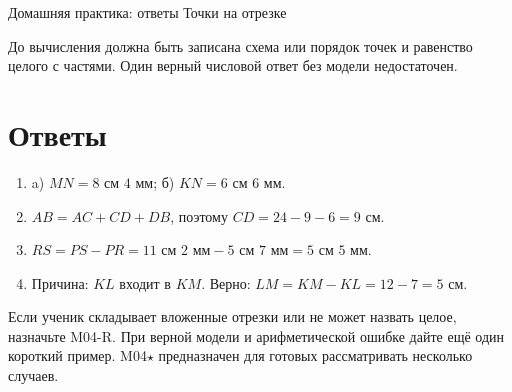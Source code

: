 \worksheettitle
  {Домашняя практика: ответы}
  { Точки на отрезке}

\begin{teacherbox}[Критерии]
  До вычисления должна быть записана схема или порядок точек и равенство
  целого с частями. Один верный числовой ответ без модели недостаточен.
\end{teacherbox}

\section{Ответы}

\begin{enumerate}
  \item a) $MN=8\text{ см }4\text{ мм}$;
    б) $KN=6\text{ см }6\text{ мм}$.
  \item $AB=AC+CD+DB$, поэтому $CD=24-9-6=9$ см.
  \item $RS=PS-PR=11\text{ см }2\text{ мм}-5\text{ см }7\text{ мм}
    =5\text{ см }5\text{ мм}$.
  \item Причина: $KL$ входит в $KM$. Верно:
    $LM=KM-KL=12-7=5$ см.
\end{enumerate}

\begin{resultbox}[Маршрут]
  Если ученик складывает вложенные отрезки или не может назвать целое,
  назначьте M04-R. При верной модели и арифметической ошибке дайте ещё один
  короткий пример. M04\(\star\) предназначен для готовых рассматривать
  несколько случаев.
\end{resultbox}
